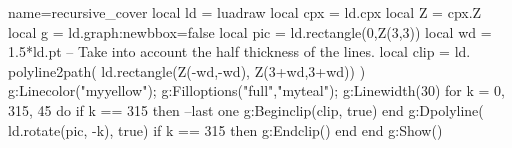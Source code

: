 \documentclass[tikz,border=5pt]{standalone}
\begin{document}
\begin{luadraw}{name=recursive_cover}
local ld = luadraw
local cpx = ld.cpx
local Z = cpx.Z
local g = ld.graph:new{bbox=false}
local pic = ld.rectangle(0,Z(3,3))
local wd = 1.5*ld.pt -- Take into account the half thickness of the lines.
local clip = ld. polyline2path( ld.rectangle(Z(-wd,-wd), Z(3+wd,3+wd)) )
g:Linecolor("myyellow"); g:Filloptions("full","myteal"); g:Linewidth(30)
for k = 0, 315, 45 do
    if k == 315 then --last one
        g:Beginclip(clip, true)
    end
    g:Dpolyline( ld.rotate(pic, -k), true)
    if k == 315 then g:Endclip() end
end
g:Show()
\end{luadraw}
\end{document}
